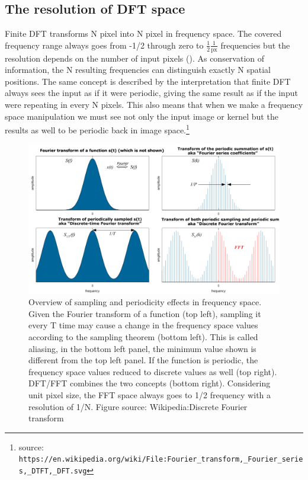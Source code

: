 \subsection{The resolution of DFT space\label{sec:dft}}
\par Finite DFT transforms N pixel into N pixel in frequency space. The
covered frequency range always goes from -1/2 through zero to \(\frac{1}{2}
\frac{1}{\mathrm{px}}\) frequencies but the resolution depends on the number
of input pixels (). As conservation of information,
the N resulting frequencies can distinguish exactly N spatial positions. The
same concept is described by the interpretation that finite DFT always sees
the input as if it were periodic, giving the same result as if the input
were repeating in every N pixels. This also means that when we make a
frequency space manipulation we must see not only the input image or kernel
but the results as well to be periodic back in image
space.\footnote{ source:
  \texttt{https://en.wikipedia.org/wiki/File:Fourier\_transform,\_Fourier\_series,\_DTFT,\_DFT.svg}}
\begin{figure}[h]
\begin{center}
\includegraphics[width=5.5in]{fig/dft_sampling.pdf}
\end{center}
\caption{\label{fig:dft_sampling}Overview of sampling and periodicity
  effects in frequency space. Given the Fourier transform of a
  function (top left), sampling it every T time may cause a change in
  the frequency space values according to the sampling theorem (bottom
  left). This is called aliasing, in the bottom left panel, the
  minimum value shown is different from the top left panel. If the
  function is periodic, the frequency space values reduced to discrete
  values as well (top right). DFT/FFT combines the two concepts
  (bottom right). Considering unit pixel size, the FFT space always
  goes to 1/2 frequency with a resolution of 1/N. Figure source:
  Wikipedia:Discrete Fourier transform}
\end{figure}
%

